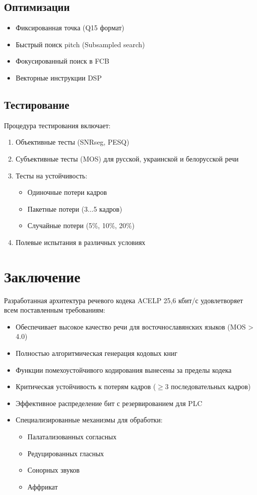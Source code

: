\documentclass{report}
\begin{document}
	\section{Оптимизации}
	\begin{itemize}
		\item Фиксированная точка (Q15 формат)
		\item Быстрый поиск pitch (Subsampled search)
		\item Фокусированный поиск в FCB
		\item Векторные инструкции DSP
	\end{itemize}
	
	\section{Тестирование}
	Процедура тестирования включает:
	\begin{enumerate}
		\item Объективные тесты (SNRseg, PESQ)
		\item Субъективные тесты (MOS) для русской, украинской и белорусской речи
		\item Тесты на устойчивость:
		\begin{itemize}
			\item Одиночные потери кадров
			\item Пакетные потери (3$\ldots$5 кадров)
			\item Случайные потери (5\%, 10\%, 20\%)
		\end{itemize}
		\item Полевые испытания в различных условиях
	\end{enumerate}
	
	\chapter*{Заключение}
	Разработанная архитектура речевого кодека ACELP 25,6 кбит/с удовлетворяет всем поставленным требованиям:
	\begin{itemize}
		\item Обеспечивает высокое качество речи для восточнославянских языков (MOS > 4.0)
		\item Полностью алгоритмическая генерация кодовых книг
		\item Функции помехоустойчивого кодирования вынесены за пределы кодека
		\item Критическая устойчивость к потерям кадров ($\geqslant$3 последовательных кадров)
		\item Эффективное распределение бит с резервированием для PLC
		\item Специализированные механизмы для обработки:
		\begin{itemize}
			\item Палатализованных согласных
			\item Редуцированных гласных
			\item Сонорных звуков
			\item Аффрикат
		\end{itemize}
	\end{itemize}
	
\end{document}
